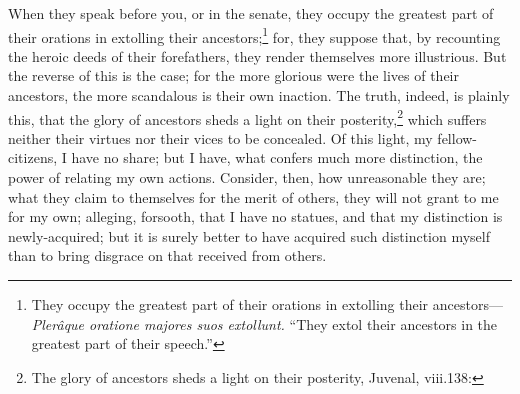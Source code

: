 When they speak before you, or in the senate, they occupy the
greatest part of their orations in extolling their ancestors;\footnote{They occupy the greatest part of their orations in extolling their
ancestors—\emph{Plerâque oratione majores suos extollunt.} ``They extol their
ancestors in the greatest part of their speech.''}
for, they suppose that, by recounting the heroic deeds of their
forefathers, they render themselves more illustrious. But the reverse
of this is the case; for the more glorious were the lives of their
ancestors, the more scandalous is their own inaction. The truth,
indeed, is plainly this, that the glory of ancestors sheds a light on
their posterity,\footnote{The glory of ancestors sheds a light on their posterity, Juvenal,
viii.138:} which suffers neither their virtues nor their
vices to be concealed. Of this light, my fellow-citizens, I have no
share; but I have, what confers much more distinction, the power of
relating my own actions. Consider, then, how unreasonable they are;
what they claim to themselves for the merit of others, they will not
grant to me for my own; alleging, forsooth, that I have no statues,
and that my distinction is newly-acquired; but it is surely better to
have acquired such distinction myself than to bring disgrace on that
received from others.

